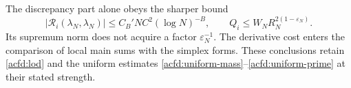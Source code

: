 The discrepancy part alone obeys the sharper bound
\[
 |\mathcal R_i(\lambda_N,\lambda_N)|
       \leq C_B'NC^2(\log N)^{-B},\qquad
 Q_i\leq W_NR_N^{2(1-\varepsilon_N)}.
\]
Its supremum norm does not acquire a factor $\varepsilon_N^{-1}$.
The derivative cost enters the comparison of local main sums with the simplex forms.
These conclusions retain \eqref{acfd:lod} and the uniform estimates
\eqref{acfd:uniform-mass}--\eqref{acfd:uniform-prime} at their stated strength.
